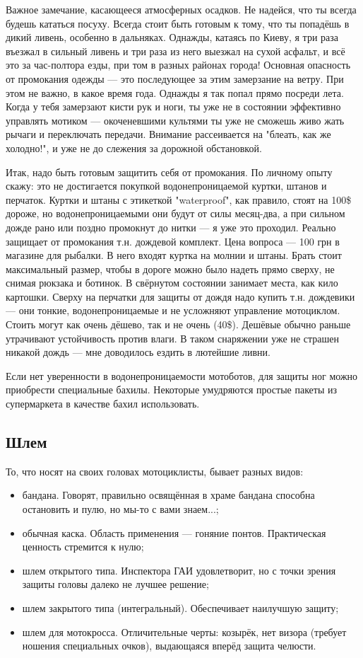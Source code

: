 \documentclass[12pt,a4paper]{article}
\begin{document}
Важное замечание, касающееся атмосферных осадков. Не надейся, что ты
всегда будешь кататься посуху. Всегда стоит быть готовым к тому, что
ты попадёшь в дикий ливень, особенно в дальняках. Однажды, катаясь
по Киеву, я три раза въезжал в сильный ливень и три раза из него выезжал
на сухой асфальт, и всё это за час-полтора езды, при том в разных
районах города! Основная опасность от промокания одежды --- это
последующее за этим замерзание на ветру. При этом не важно, в какое
время года. Однажды я так попал прямо посреди лета. Когда у тебя
замерзают кисти рук и ноги, ты уже не в состоянии эффективно управлять
мотиком --- окоченевшими культями ты уже не сможешь живо жать рычаги и
переключать передачи. Внимание рассеивается на "блеать, как же
холодно!", и уже не до слежения за дорожной обстановкой.

Итак, надо быть готовым защитить себя от промокания. По личному опыту
скажу: это не достигается покупкой водонепроницаемой куртки, штанов и
перчаток. Куртки и штаны с этикеткой "waterproof", как правило, стоят
на 100\$ дороже, но водонепроницаемыми они будут от силы месяц-два, а
при сильном дожде рано или поздно промокнут до нитки --- я уже это
проходил. Реально защищает от промокания т.н. дождевой комплект. Цена
вопроса --- 100 грн в магазине для рыбалки. В него входят куртка на
молнии и штаны. Брать стоит максимальный размер, чтобы в дороге можно
было надеть прямо сверху, не снимая рюкзака и ботинок. В свёрнутом
состоянии занимает места, как кило картошки. Сверху на перчатки для
защиты от дождя надо купить т.н. дождевики --- они тонкие,
водонепроницаемые и не усложняют управление мотоциклом. Стоить могут
как очень дёшево, так и не очень (40\$). Дешёвые обычно раньше
утрачивают устойчивость против влаги. В таком снаряжении уже не страшен
никакой дождь --- мне доводилось ездить в лютейшие ливни.

Если нет уверенности в водонепроницаемости мотоботов, для защиты ног
можно приобрести специальные бахилы. Некоторые умудряются простые
пакеты из супермаркета в качестве бахил использовать.

\subsection{Шлем}

То, что носят на своих головах мотоциклисты, бывает разных видов:

\begin{itemize}
\item бандана. Говорят, правильно освящённая в храме бандана способна
остановить и пулю, но мы-то с вами знаем...;
\item обычная каска. Область применения --- гоняние понтов. Практическая
ценность стремится к нулю;
\item шлем открытого типа. Инспектора ГАИ удовлетворит, но с точки
зрения защиты головы далеко не лучшее решение;
\item шлем закрытого типа (интегральный). Обеспечивает наилучшую защиту;
\item шлем для мотокросса. Отличительные черты: козырёк, нет визора
(требует ношения специальных очков), выдающаяся вперёд защита челюсти.
\end{itemize}
\end{document}
